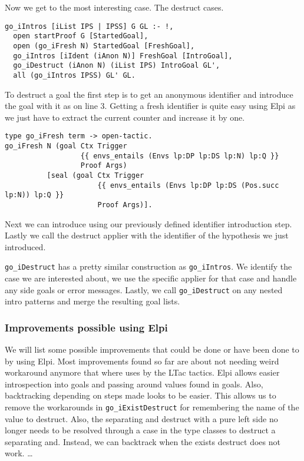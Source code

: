 \documentclass[thesis.tex]{subfiles}
\begin{document}
Now we get to the most interesting case. The destruct cases.
\begin{verbatim}
go_iIntros [iList IPS | IPSS] G GL :- !,
  open startProof G [StartedGoal],
  open (go_iFresh N) StartedGoal [FreshGoal],
  go_iIntros [iIdent (iAnon N)] FreshGoal [IntroGoal],
  go_iDestruct (iAnon N) (iList IPS) IntroGoal GL',
  all (go_iIntros IPSS) GL' GL.
\end{verbatim}
To destruct a goal the first step is to get an anonymous identifier and introduce the goal with it as on line 3. Getting a fresh identifier is quite easy using Elpi as we just have to extract the current counter and increase it by one.
\begin{verbatim}
type go_iFresh term -> open-tactic.
go_iFresh N (goal Ctx Trigger 
                  {{ envs_entails (Envs lp:DP lp:DS lp:N) lp:Q }} 
                  Proof Args) 
          [seal (goal Ctx Trigger 
                      {{ envs_entails (Envs lp:DP lp:DS (Pos.succ lp:N)) lp:Q }} 
                      Proof Args)].
\end{verbatim}
Next we can introduce using our previously defined identifier introduction step. Lastly we call the destruct applier with the identifier of the hypothesis we just introduced.

\texttt{go_iDestruct} has a pretty similar construction as \texttt{go_iIntros}. We identify the case we are interested about, we use the specific applier for that case and handle any side goals or error messages. Lastly, we call \texttt{go_iDestruct} on any nested intro patterns and merge the resulting goal lists.

\subsubsection*{Improvements possible using Elpi}
We will list some possible improvements that could be done or have been done to by using Elpi. Most improvements found so far are about not needing weird workaround anymore that where uses by the LTac tactics. Elpi allows easier introspection into goals and passing around values found in goals. Also, backtracking depending on steps made looks to be easier. This allows us to remove the workarounds in \texttt{go_iExistDestruct} for remembering the name of the value to destruct. Also, the separating and destruct with a pure left side no longer needs to be resolved through a case in the type classes to destruct a separating and. Instead, we can backtrack when the exists destruct does not work.
\dots
\end{document}
